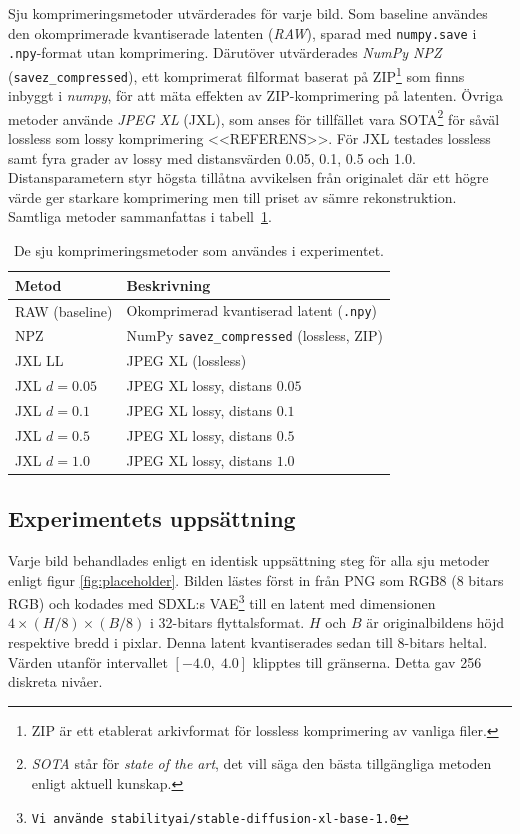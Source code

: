 Sju komprimeringsmetoder utvärderades för varje bild. Som baseline användes den okomprimerade kvantiserade latenten (\textit{RAW}), sparad med \texttt{numpy.save} i \texttt{.npy}-format utan komprimering. Därutöver utvärderades \textit{NumPy NPZ} (\texttt{savez\_compressed}), ett komprimerat filformat baserat på ZIP\footnote{ZIP är ett etablerat arkivformat för lossless komprimering av vanliga filer.} som finns inbyggt i \emph{numpy}, för att mäta effekten av ZIP-komprimering på latenten. Övriga metoder använde
\textit{JPEG XL} (JXL), som anses för tillfället vara SOTA\footnote{\textit{SOTA} står för \textit{state of the art}, det vill säga den bästa tillgängliga metoden enligt aktuell kunskap.} för såväl lossless som lossy komprimering <<REFERENS>>.
För JXL testades lossless samt fyra grader av lossy
med distansvärden 0{.}05, 0{.}1, 0{.}5 och 1{.}0.
Distansparametern styr högsta tillåtna avvikelsen från originalet där ett högre värde ger
starkare komprimering men till priset av sämre rekonstruktion.
Samtliga metoder sammanfattas i tabell~\ref{tab:strategier}.

\begin{table}[h]
\centering
\caption{De sju komprimeringsmetoder som användes i experimentet.}
\label{tab:strategier}
\begin{tabular}{ll}
\hline
\textbf{Metod} & \textbf{Beskrivning} \\
\hline
RAW (baseline)              & Okomprimerad kvantiserad latent (\texttt{.npy}) \\
NPZ                         & NumPy \texttt{savez\_compressed} (lossless, ZIP) \\
JXL LL    & JPEG XL (lossless) \\
JXL $d=0{.}05$   & JPEG XL lossy, distans $0{.}05$ \\
JXL $d=0{.}1$    & JPEG XL lossy, distans $0{.}1$ \\
JXL $d=0{.}5$    & JPEG XL lossy, distans $0{.}5$ \\
JXL $d=1{.}0$    & JPEG XL lossy, distans $1{.}0$ \\
\hline
\end{tabular}
\end{table}

\subsection*{Experimentets uppsättning}
Varje bild behandlades enligt en identisk uppsättning steg för alla sju metoder enligt figur \ref{fig:placeholder}.
Bilden lästes först in från PNG som RGB8 (8 bitars RGB) och kodades med SDXL:s VAE\footnote{\texttt{Vi använde stabilityai/stable-diffusion-xl-base-1.0}} till en latent med dimensionen $4 \times (H/8) \times (B/8)$ i 32-bitars flyttalsformat. $H$ och $B$ är originalbildens höjd respektive bredd i pixlar.
Denna latent kvantiserades sedan till 8-bitars heltal. Värden utanför
intervallet $[-4{.}0,\; 4{.}0]$ klipptes till gränserna.
Detta gav 256 diskreta nivåer.

